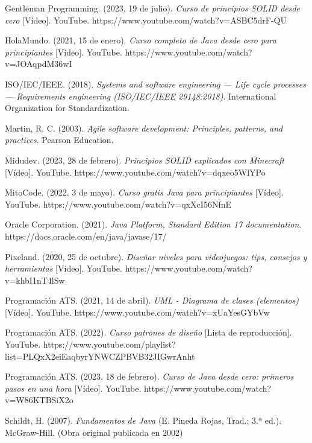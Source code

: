 \documentclass[stu,12pt,floatsintext]{apa7}
\begin{document}
\begin{thebibliography}{}
Gentleman Programming. (2023, 19 de julio). \textit{Curso de principios SOLID desde cero} [Vídeo]. YouTube. https://www.youtube.com/watch?v=ASBC5drF-QU

HolaMundo. (2021, 15 de enero). \textit{Curso completo de Java desde cero para principiantes} [Vídeo]. YouTube. https://www.youtube.com/watch?v=JOAqpdM36wI

ISO/IEC/IEEE. (2018). \textit{Systems and software engineering — Life cycle processes — Requirements engineering (ISO/IEC/IEEE 29148:2018)}. International Organization for Standardization.

Martin, R. C. (2003). \textit{Agile software development: Principles, patterns, and practices}. Pearson Education.

Midudev. (2023, 28 de febrero). \textit{Principios SOLID explicados con Minecraft} [Vídeo]. YouTube. https://www.youtube.com/watch?v=dqxeo5WlYPo

MitoCode. (2022, 3 de mayo). \textit{Curso gratis Java para principiantes} [Vídeo]. YouTube. https://www.youtube.com/watch?v=qxXcI56NfnE

Oracle Corporation. (2021). \textit{Java Platform, Standard Edition 17 documentation}. https://docs.oracle.com/en/java/javase/17/

Pixeland. (2020, 25 de octubre). \textit{Diseñar niveles para videojuegos: tips, consejos y herramientas} [Vídeo]. YouTube. https://www.youtube.com/watch?v=khbI1nT4lSw

Programación ATS. (2021, 14 de abril). \textit{UML - Diagrama de clases (elementos)} [Vídeo]. YouTube. https://www.youtube.com/watch?v=xUaYesGYbVw

Programación ATS. (2022). \textit{Curso patrones de diseño} [Lista de reproducción]. YouTube. https://www.youtube.com/playlist?list=PLQxX2eiEaqbyrYNWCZPBVB32JIGwrAnht

Programación ATS. (2023, 18 de febrero). \textit{Curso de Java desde cero: primeros pasos en una hora} [Vídeo]. YouTube. https://www.youtube.com/watch?v=W86KTBSiX2o

Schildt, H. (2007). \textit{Fundamentos de Java} (E. Pineda Rojas, Trad.; 3.ª ed.). McGraw-Hill. (Obra original publicada en 2002)


\end{thebibliography}
\end{document}
